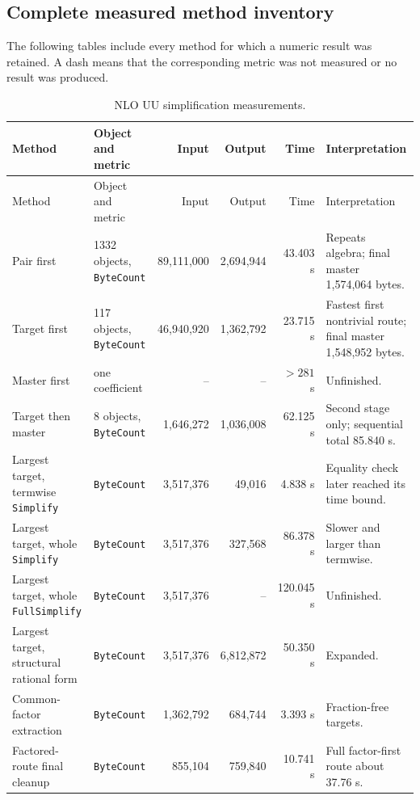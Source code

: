 \documentclass[11pt]{article}
\newcommand{\code}[1]{\texttt{#1}}
\begin{document}
\clearpage
\appendix
\begin{landscape}
\section{Complete measured method inventory}
\label{app:all-methods}

The following tables include every method for which a numeric result was
retained.  A dash means that the corresponding metric was not measured or no
result was produced.

\scriptsize
\begin{longtable}{@{}llrrrl@{}}
\caption{NLO UU simplification measurements.}\label{tab:all-nlouu}\\
\toprule
Method & Object and metric & Input & Output & Time & Interpretation \\
\midrule
\endfirsthead
\toprule
Method & Object and metric & Input & Output & Time & Interpretation \\
\midrule
\endhead
Pair first & 1332 objects, \code{ByteCount} & 89,111,000 & 2,694,944 & 43.403 s & Repeats algebra; final master 1,574,064 bytes.\\
Target first & 117 objects, \code{ByteCount} & 46,940,920 & 1,362,792 & 23.715 s & Fastest first nontrivial route; final master 1,548,952 bytes.\\
Master first & one coefficient & -- & -- & $>281$ s & Unfinished.\\
Target then master & 8 objects, \code{ByteCount} & 1,646,272 & 1,036,008 & 62.125 s & Second stage only; sequential total 85.840 s.\\
Largest target, termwise \code{Simplify} & \code{ByteCount} & 3,517,376 & 49,016 & 4.838 s & Equality check later reached its time bound.\\
Largest target, whole \code{Simplify} & \code{ByteCount} & 3,517,376 & 327,568 & 86.378 s & Slower and larger than termwise.\\
Largest target, whole \code{FullSimplify} & \code{ByteCount} & 3,517,376 & -- & 120.045 s & Unfinished.\\
Largest target, structural rational form & \code{ByteCount} & 3,517,376 & 6,812,872 & 50.350 s & Expanded.\\
Common-factor extraction & \code{ByteCount} & 1,362,792 & 684,744 & 3.393 s & Fraction-free targets.\\
Factored-route final cleanup & \code{ByteCount} & 855,104 & 759,840 & 10.741 s & Full factor-first route about 37.76 s.\\

\end{longtable}
\end{landscape}
\end{document}
